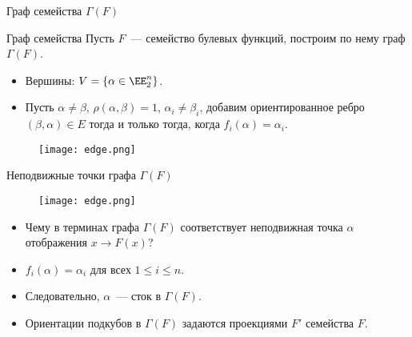 \begin{frame}{Граф семейства $\Gamma(F)$}
    \begin{block}{Граф семейства}
        Пусть $F$~--- семейство булевых функций, построим по нему граф $\Gamma(F)$.
        \pause
        \begin{itemize}
            \item Вершины: $V = \{ \alpha \in \EE_2^n \}$.
            \pause
            \item Пусть $\alpha \ne \beta$, $\rho(\alpha, \beta) = 1$, $\alpha_i \ne \beta_i$, добавим ориентированное ребро $(\beta, \alpha) \in E$ тогда и только тогда, когда $f_i(\alpha) = \alpha_i$.
        \end{itemize}
    \end{block}
    \pause
    \begin{figure}
        \centering
        \texttt{[image: edge.png]}
    \end{figure}
\end{frame}


\begin{frame}{Неподвижные точки графа $\Gamma(F)$}
    \begin{figure}
        \centering
        \texttt{[image: edge.png]}
    \end{figure}
    \begin{itemize}
        \item Чему в терминах графа $\Gamma(F)$ соответствует неподвижная точка $\alpha$ отображения $x \to F(x)$?
        \pause
        \item $f_i(\alpha) = \alpha_i$ для всех $1 \le i \le n$.
        \pause 
        \item Следовательно, $\alpha$~--- сток в $\Gamma(F)$.
        \pause 
        \item Ориентации подкубов в $\Gamma(F)$ задаются проекциями $F'$ семейства $F$.
    \end{itemize}
\end{frame}


